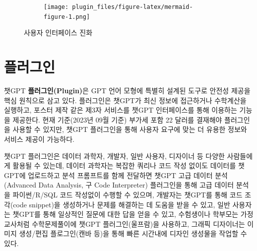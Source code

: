 \documentclass[
  letterpaper,
]{book}
\begin{document}
\begin{figure}

{\centering 

\begin{figure}[H]

{\centering \texttt{[image: plugin\_files/figure-latex/mermaid-figure-1.png]}

}

\end{figure}

}

\caption{\label{fig-ui-evolution}사용자 인터페이스 진화}

\end{figure}

{}

\hypertarget{uxd50cuxb7ecuxadf8uxc778}{%
\section{플러그인}\label{uxd50cuxb7ecuxadf8uxc778}}

챗GPT \textbf{플러그인(Plugin)}은 GPT 언어 모형에 특별히 설계된 도구로
안전성 제공을 핵심 원칙으로 삼고 있다. 플러그인은 챗GPT가 최신 정보에
접근하거나 수학계산을 실행하고, 포스터 제작 같은 제3자 서비스를 챗GPT
인터페이스를 통해 이용하는 기능을 제공한다. 현재 기준(2023년 09월 기준)
부가세 포함 22 달러를 결재해야 플러그인을 사용할 수 있지만, 챗GPT
플러그인을 통해 사용자 요구에 맞는 더 유용한 정보와 서비스 제공이
가능하다.

챗GPT 플러그인은 데이터 과학자, 개발자, 일반 사용자, 디자이너 등 다양한
사람들에게 활용될 수 있는데, 데이터 과학자는 복잡한 쿼리나 코드 작성
없이도 데이터를 챗GPT에 업로드하고 분석 프롬프트를 함께 전달하면 챗GPT
고급 데이터 분석(Advanced Data Analysis, 구 Code Interpreter) 플러그인을
통해 고급 데이터 분석을 파이썬/R/SQL 코드 작성없이 수행할 수 있으며,
개발자는 챗GPT를 통해 코드 조각(code snippet)을 생성하거나 문제를
해결하는 데 도움을 받을 수 있고, 일반 사용자는 챗GPT를 통해 일상적인
질문에 대한 답을 얻을 수 있고, 수험생이나 학부모는 가정교사처럼
수학문제풀이에 챗GPT 플러그인(울프람)을 사용하고, 그래픽 디자이너는
이미지 생성/편집 플로그인(캔바 등)을 통해 빠른 시간내에 디자인 생성물을
작업할 수 있다.
\end{document}
